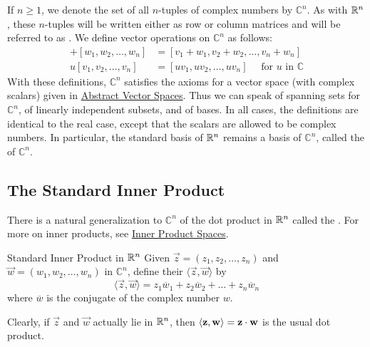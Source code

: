 \documentclass{ximera}
\begin{document}
If $n \ge 1$, we denote the set of all $n$-tuples of complex numbers by $\mathbb{C}^n$. As with $\mathbb{R}^n$, these $n$-tuples will be written either as row or column matrices and will be referred to as . We define vector operations on $\mathbb{C}^n$ as follows:
\begin{align*}
[v_{1},  v_{2}, \ldots, v_{n}] + [w_{1}, w_{2}, \ldots, w_{n}] &= [v_{1} + w_{1}, v_{2} + w_{2}, \ldots, v_{n} + w_{n}] \\
u[v_{1}, v_{2}, \ldots, v_{n}] &= [uv_{1}, uv_{2}, \ldots, uv_{n}] \quad \mbox{ for } u \mbox{ in } \mathbb{C}
\end{align*}
With these definitions, $\mathbb{C}^n$ satisfies the axioms for a vector space (with complex scalars) given in \href{https://ximera.osu.edu/oerlinalg/LinearAlgebra/VSP-0050/main}{Abstract Vector Spaces}. Thus we can speak of spanning sets for $\mathbb{C}^n$, of linearly independent subsets, and of bases. In all cases, the definitions are identical to the real case, except that the scalars are allowed to be complex numbers. In particular, the standard basis of $\mathbb{R}^n$ remains a basis of $\mathbb{C}^n$, called the  of $\mathbb{C}^n$.


\subsection*{The Standard Inner Product}

There is a natural generalization to $\mathbb{C}^n$ of the dot product in $\mathbb{R}^n$ called the .  For more on inner products, see \href{}{Inner Product Spaces}.

\begin{definition}{Standard Inner Product in $\mathbb{R}^n$}\label{def:025549}
Given $\vec{z} = (z_{1}, z_{2}, \ldots, z_{n})$ and $\vec{w} = (w_{1}, w_{2}, \ldots, w_{n})$ in $\mathbb{C}^n$, define their  $\langle \vec{z}, \vec{w} \rangle$ by
\begin{equation*}
\langle \vec{z}, \vec{w} \rangle = z_{1}\overline{w}_{1} + z_{2}\overline{w}_{2} + \ldots + z_{n}\overline{w}_{n}
\end{equation*}
where $\overline{w}$ is the conjugate of the complex number $w$.
\end{definition}

Clearly, if $\vec{z}$ and $\vec{w}$ actually lie in $\mathbb{R}^n$, then $\langle \mathbf{z}, \mathbf{w} \rangle = \mathbf{z} \cdot \mathbf{w}$ is the usual dot product.
\end{document}
